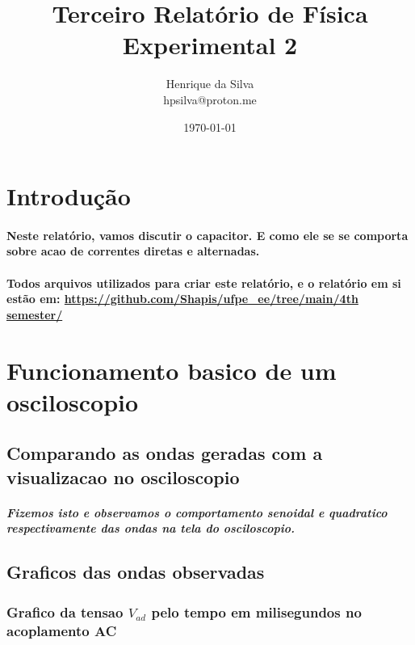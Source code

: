 \documentclass[12pt,twoside, a4paper, twocolumn]{article}
\title{Terceiro Relatório de Física Experimental 2}
\author{Henrique da Silva \\ hpsilva@proton.me}
\date{\today}
\begin{document}
\maketitle
{}
\newpage
\tableofcontents
\newpage

\section{Introdução}

\paragraph*{Neste relatório, vamos discutir o capacitor. E como ele se se comporta sobre acao de correntes diretas e alternadas.}

\paragraph*{Todos arquivos utilizados para criar este relatório, e o relatório em si estão em:  \url{https://github.com/Shapis/ufpe_ee/tree/main/4th semester/}}


\section{Funcionamento basico de um osciloscopio}

\subsection{Comparando as ondas geradas com a visualizacao no osciloscopio}

\subparagraph*{Fizemos isto e observamos o comportamento senoidal e quadratico respectivamente das ondas na tela do osciloscopio.}

\subsection{Graficos das ondas observadas}

\subsubsection{Grafico da tensao $V_{ad}$ pelo tempo em milisegundos no acoplamento AC}

\end{document}
